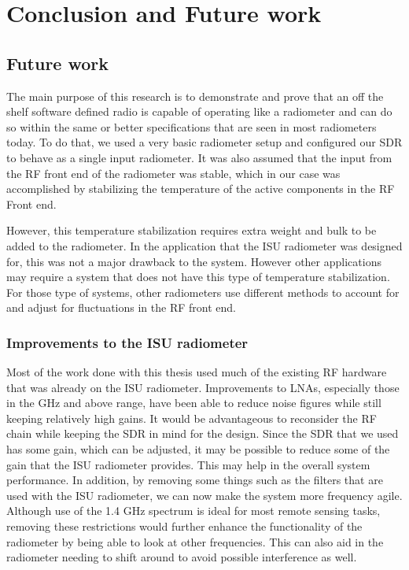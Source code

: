 \chapter{Conclusion and Future work}

\section{Future work}
The main purpose of this research is to demonstrate and prove that an off the shelf software defined radio is capable of operating like a radiometer and can do so within the same or better specifications that are seen in most radiometers today.  To do that, we used a very basic radiometer setup and configured our SDR to behave as a single input radiometer.  It was also assumed that the input from the RF front end of the radiometer was stable, which in our case was accomplished by stabilizing the temperature of the active components in the RF Front end.

However, this temperature stabilization requires extra weight and bulk to be added to the radiometer.  In the application that the ISU radiometer was designed for, this was not a major drawback to the system.  However other applications may require a system that does not have this type of temperature stabilization.  For those type of systems, other radiometers use different methods to account for and adjust for fluctuations in the RF front end. 

\subsection{Improvements to the ISU radiometer}

Most of the work done with this thesis used much of the existing RF hardware that was already on the ISU radiometer.  Improvements to LNAs, especially those in the GHz and above range, have been able to reduce noise figures while still keeping relatively high gains.  It would be advantageous to reconsider the RF chain while keeping the SDR in mind for the design.  Since the SDR that we used has some gain, which can be adjusted, it may be possible to reduce some of the gain that the ISU radiometer provides. This may help in the overall system performance.  In addition, by removing some things such as the filters that are used with the ISU radiometer, we can now make the system more frequency agile.  Although use of the 1.4 GHz spectrum is ideal for most remote sensing tasks, removing these restrictions would further enhance the functionality of the radiometer by being able to look at other frequencies.  This can also aid in the radiometer needing to shift around to avoid possible interference as well.  

